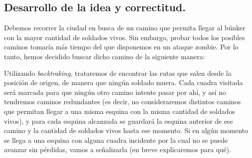 \vspace*{0.6cm}

\subsection{Desarrollo de la idea y correctitud.}

\vspace*{0.3cm}

%

Debemos recorrer la ciudad en busca de un camino que permita llegar al búnker con la mayor cantidad de soldados vivos.  Sin embargo, probar todos los posibles caminos tomaría más tiempo del que disponemos en un ataque zombie.  Por lo tanto, hemos decidido buscar dicho camino de la siguiente manera:

Utilizando {\it backtraking}, trataremos de encontrar las rutas que salen desde la posición de origen, de manera que ningún soldado muera.  Cada cuadra visitada será marcada para que ningún otro camino intente pasar por ahí, y así no tendremos caminos redundantes (es decir, no consideraremos distintos caminos que permitan llegar a una misma esquina con la misma cantidad de soldados vivos), y para cada esquina alcanzada se guardará la esquina anterior de ese camino y la cantidad de soldados vivos hasta ese momento.  Si en algún momento se llega a una esquina con alguna cuadra incidente por la cual no se puede avanzar sin pérdidas, vamos a señalizarla (en breve explicaremos para qué). 

